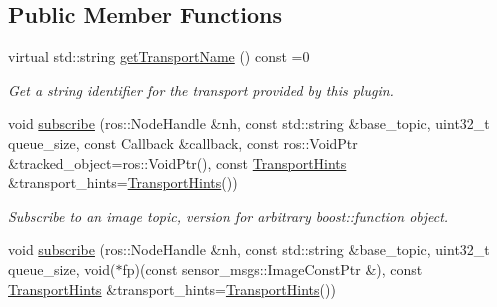 \subsection*{Public Member Functions}
\begin{DoxyCompactItemize}
\item 
\hypertarget{classimage__transport_1_1_subscriber_plugin_a647dc0f6e0c34f0b4d8b809b3c679f88}{virtual std\-::string \hyperlink{classimage__transport_1_1_subscriber_plugin_a647dc0f6e0c34f0b4d8b809b3c679f88}{get\-Transport\-Name} () const =0}\label{classimage__transport_1_1_subscriber_plugin_a647dc0f6e0c34f0b4d8b809b3c679f88}

\begin{DoxyCompactList}\small\item\em Get a string identifier for the transport provided by this plugin. \end{DoxyCompactList}\item 
\hypertarget{classimage__transport_1_1_subscriber_plugin_abf53246a79405014beab159908a11ec8}{void \hyperlink{classimage__transport_1_1_subscriber_plugin_abf53246a79405014beab159908a11ec8}{subscribe} (ros\-::\-Node\-Handle \&nh, const std\-::string \&base\-\_\-topic, uint32\-\_\-t queue\-\_\-size, const Callback \&callback, const ros\-::\-Void\-Ptr \&tracked\-\_\-object=ros\-::\-Void\-Ptr(), const \hyperlink{classimage__transport_1_1_transport_hints}{Transport\-Hints} \&transport\-\_\-hints=\hyperlink{classimage__transport_1_1_transport_hints}{Transport\-Hints}())}\label{classimage__transport_1_1_subscriber_plugin_abf53246a79405014beab159908a11ec8}

\begin{DoxyCompactList}\small\item\em Subscribe to an image topic, version for arbitrary boost\-::function object. \end{DoxyCompactList}\item 
\hypertarget{classimage__transport_1_1_subscriber_plugin_a699938e88a295ad3ae6d770fceb41690}{void \hyperlink{classimage__transport_1_1_subscriber_plugin_a699938e88a295ad3ae6d770fceb41690}{subscribe} (ros\-::\-Node\-Handle \&nh, const std\-::string \&base\-\_\-topic, uint32\-\_\-t queue\-\_\-size, void($\ast$fp)(const sensor\-\_\-msgs\-::\-Image\-Const\-Ptr \&), const \hyperlink{classimage__transport_1_1_transport_hints}{Transport\-Hints} \&transport\-\_\-hints=\hyperlink{classimage__transport_1_1_transport_hints}{Transport\-Hints}())}\label{classimage__transport_1_1_subscriber_plugin_a699938e88a295ad3ae6d770fceb41690}


\end{DoxyCompactItemize}
